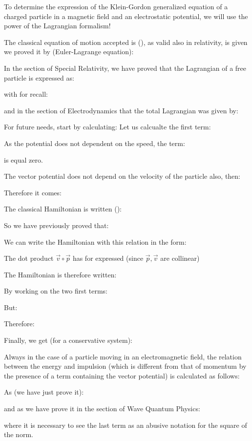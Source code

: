	To determine the expression of the Klein-Gordon generalized equation of a charged particle in a magnetic field and an electrostatic potential, we will use the power of the Lagrangian formalism!

	The classical equation of motion accepted is (), as valid also in relativity, is given we proved it by (Euler-Lagrange equation):
	
	In the section of Special Relativity, we have proved that the Lagrangian of a free particle is expressed as:
	
	with for recall:
	
	and in the section of Electrodynamics that the total Lagrangian was given by:
	
	For future needs, start by calculating:
	Let us calcualte the first term:
	
	As the potential does not dependent on the speed, the term:
	
	is equal zero.

	The vector potential does not depend on the velocity of the particle also, then:
	
	Therefore it comes:
	
	The classical Hamiltonian is written ():
	
	So we have previously proved that:
	
	We can write the Hamiltonian with this relation in the form:
	
	The dot product $\vec{v}\circ\vec{p}$ has for expressed (since $\vec{p},\vec{v}$ are collinear)
	
	The Hamiltonian is therefore written:
	
	By working on the two first terms:
	
	But:
	
	Therefore:
	
	Finally, we get (for a conservative system):
	
	Always in the case of a particle moving in an electromagnetic field, the relation between the energy and impulsion (which is different from that of momentum by the presence of a term containing the vector potential) is calculated as follows:

	As (we have just prove it):
	
	and as we have prove it in the section of Wave Quantum Physics:
	
	where it is necessary to see the last term as an abusive notation for the square of the norm.
	
